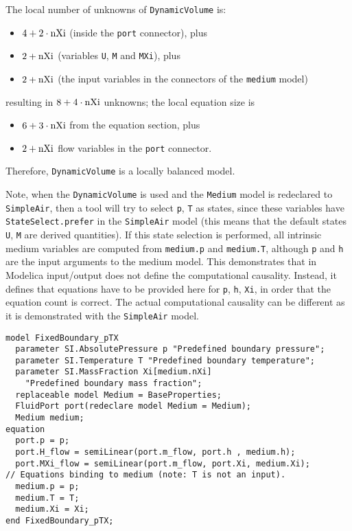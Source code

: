 \begin{example}
The local number of unknowns of \lstinline!DynamicVolume! is:
\begin{itemize}
\item
  $4 + 2 \cdot \text{\lstinline!nXi!}$ (inside the \lstinline!port! connector), plus
\item
  $2 + \text{\lstinline!nXi!}$ (variables \lstinline!U!, \lstinline!M! and \lstinline!MXi!), plus
\item
  $2 + \text{\lstinline!nXi!}$ (the input variables in the connectors of the \lstinline!medium! model)
\end{itemize}
resulting in $8 + 4 \cdot \text{\lstinline!nXi!}$ unknowns; the local equation size is
\begin{itemize}
\item
  $6 + 3 \cdot \text{\lstinline!nXi!}$ from the equation section, plus
\item
  $2 + \text{\lstinline!nXi!}$ flow variables in the \lstinline!port! connector.
\end{itemize}

Therefore, \lstinline!DynamicVolume! is a locally balanced model.

Note, when the \lstinline!DynamicVolume! is used and the \lstinline!Medium!
model is redeclared to \lstinline!SimpleAir!, then a tool will try
to select \lstinline!p!, \lstinline!T! as states, since these variables have
\lstinline!StateSelect.prefer! in the \lstinline!SimpleAir! model (this means that
the default states \lstinline!U!, \lstinline!M! are derived quantities). If this state
selection is performed, all intrinsic medium variables are computed
from \lstinline!medium.p! and \lstinline!medium.T!, although
\lstinline!p! and \lstinline!h! are the input arguments to the medium model. This demonstrates
that in Modelica input/output does not define the computational
causality. Instead, it defines that equations have to be provided here
for \lstinline!p!, \lstinline!h!, \lstinline!Xi!, in order that the equation count is correct. The
actual computational causality can be different as it is demonstrated
with the \lstinline!SimpleAir! model.

\begin{lstlisting}[language=modelica]
model FixedBoundary_pTX
  parameter SI.AbsolutePressure p "Predefined boundary pressure";
  parameter SI.Temperature T "Predefined boundary temperature";
  parameter SI.MassFraction Xi[medium.nXi]
    "Predefined boundary mass fraction";
  replaceable model Medium = BaseProperties;
  FluidPort port(redeclare model Medium = Medium);
  Medium medium;
equation
  port.p = p;
  port.H_flow = semiLinear(port.m_flow, port.h , medium.h);
  port.MXi_flow = semiLinear(port.m_flow, port.Xi, medium.Xi);
// Equations binding to medium (note: T is not an input).
  medium.p = p;
  medium.T = T;
  medium.Xi = Xi;
end FixedBoundary_pTX;
\end{lstlisting}


\end{example}
